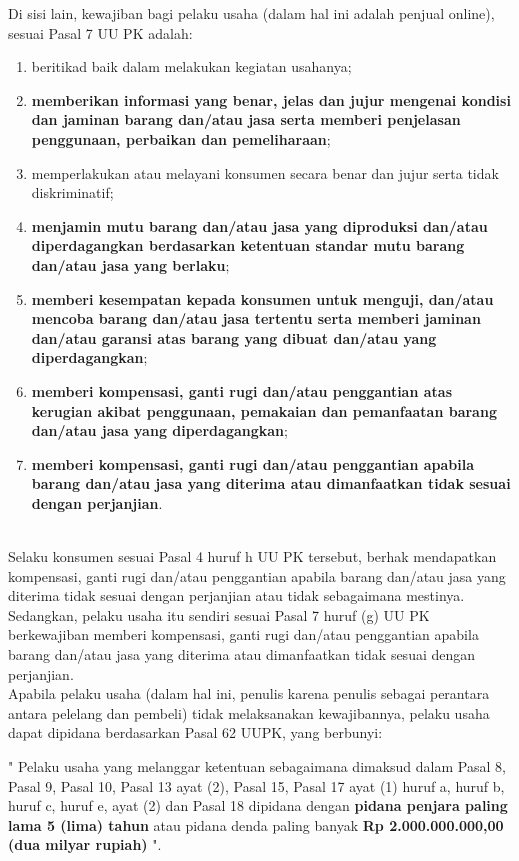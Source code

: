 Di sisi lain, kewajiban bagi pelaku usaha (dalam hal ini adalah penjual online), sesuai Pasal 7 UU PK adalah:
\begin{enumerate}
	\item beritikad baik dalam melakukan kegiatan usahanya;
	\item \textbf{memberikan informasi yang benar, jelas dan jujur mengenai kondisi dan jaminan barang dan/atau jasa serta memberi penjelasan penggunaan, perbaikan dan pemeliharaan};
	\item memperlakukan atau melayani konsumen secara benar dan jujur serta tidak diskriminatif;
	\item \textbf{menjamin mutu barang dan/atau jasa yang diproduksi dan/atau diperdagangkan berdasarkan ketentuan standar mutu barang dan/atau jasa yang berlaku};
	\item \textbf{memberi kesempatan kepada konsumen untuk menguji, dan/atau mencoba barang  dan/atau jasa tertentu serta memberi jaminan dan/atau garansi atas barang yang dibuat dan/atau yang diperdagangkan};
	\item \textbf{memberi kompensasi, ganti rugi dan/atau penggantian atas kerugian akibat penggunaan, pemakaian dan pemanfaatan barang dan/atau jasa yang diperdagangkan};
	\item \textbf{memberi kompensasi, ganti rugi dan/atau penggantian apabila barang dan/atau jasa yang diterima atau dimanfaatkan tidak sesuai dengan perjanjian}.
\end{enumerate}\ \\

\indent Selaku konsumen sesuai Pasal 4 huruf h UU PK tersebut, berhak mendapatkan kompensasi, ganti rugi dan/atau penggantian apabila barang dan/atau jasa yang diterima tidak sesuai dengan perjanjian atau tidak sebagaimana mestinya. Sedangkan, pelaku usaha itu sendiri sesuai Pasal 7 huruf (g) UU PK berkewajiban memberi kompensasi, ganti rugi dan/atau penggantian apabila barang dan/atau jasa yang diterima atau dimanfaatkan tidak sesuai dengan perjanjian.\\

\indent Apabila pelaku usaha (dalam hal ini, penulis karena penulis sebagai perantara antara pelelang dan pembeli) tidak melaksanakan kewajibannya, pelaku usaha dapat dipidana berdasarkan Pasal 62 UUPK, yang berbunyi:
\begin{displayquote}
	" Pelaku usaha yang melanggar ketentuan sebagaimana dimaksud dalam Pasal 8, Pasal 9, Pasal 10, Pasal 13 ayat (2), Pasal 15, Pasal 17 ayat (1) huruf a, huruf b, huruf c, huruf e, ayat (2) dan Pasal 18 dipidana dengan \textbf{pidana penjara paling lama 5 (lima) tahun} atau pidana denda paling banyak \textbf{Rp 2.000.000.000,00 (dua milyar rupiah)} ".
\end{displayquote}

